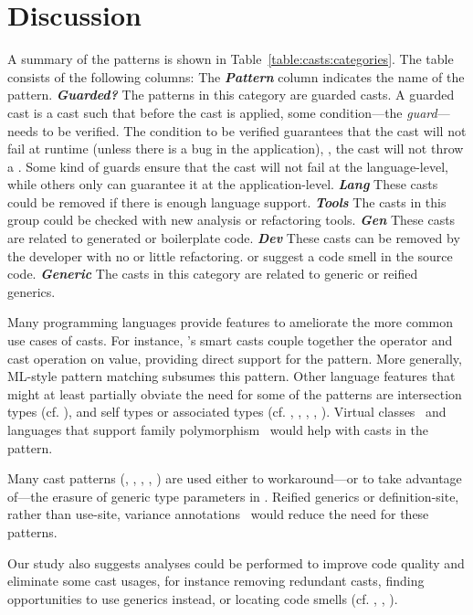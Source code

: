 \section{Discussion}
\label{sec:casts:discussion}

A summary of the patterns is shown in Table~\ref{table:casts:categories}.
The table consists of the following columns:
\newcommand{\gh}[1]{\emph{\textbf{#1}}}
The \gh{Pattern} column indicates the name of the pattern.
\gh{Guarded?} The patterns in this category are guarded casts.
A guarded cast is a cast such that before the cast is applied,
some condition---the \emph{guard}---needs to be verified.
The condition to be verified guarantees that the cast will not fail at runtime (unless there is a bug in the application), \ie,
the cast will not throw a .
Some kind of guards ensure that the cast will not fail at the language-level,
while others only can guarantee it at the application-level.
\gh{Lang} These casts could be removed if there is enough language support.
\gh{Tools} The casts in this group could be checked with new analysis or refactoring tools.
\gh{Gen} These casts are related to generated or boilerplate code.
\gh{Dev} These casts can be removed by the developer with no or little refactoring.
or suggest a code smell in the source code.
\gh{Generic} The casts in this category are related to generic or reified generics.



Many programming languages provide features to ameliorate the more common use cases of casts.
For instance,
\kotlin{}'s smart casts couple together the  operator and cast operation on value, 
providing direct support for the  pattern.
More generally, ML-style pattern matching subsumes this pattern.
Other language features that might at least partially obviate the need for some of the patterns are
intersection types (cf. ),
and self types or associated types (cf. 
,
,
,
,
).
Virtual classes~\citep{gbeta, scalaIndependentlyExtensible} and languages that support family polymorphism~\citep{ernstFamilyPolymorphism2001}
would help with casts in the  pattern.

Many cast patterns (\eg, 
,
,
,
)
are used either to 
workaround---or to take advantage of---the erasure of generic type parameters in \java{}.
Reified generics or definition-site, rather than use-site, variance annotations~\citep{altidorTamingWildcardsCombining2011}
would reduce the need for these patterns.

Our study also suggests analyses could be performed to improve code quality and eliminate some cast usages,
for instance removing redundant casts,
finding opportunities to use generics instead,
or locating code smells (cf.
,
,
).